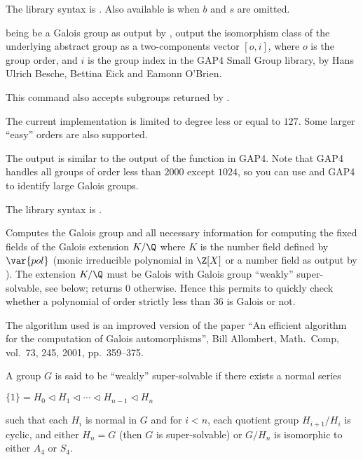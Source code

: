 The library syntax is .
Also available is  when $b$ and $s$
are omitted.

\label{se:galoisidentify}
 being be a Galois group as output by ,
output the isomorphism class of the underlying abstract group as a
two-components vector $[o,i]$, where $o$ is the group order, and $i$ is the
group index in the GAP4 Small Group library, by Hans Ulrich Besche, Bettina
Eick and Eamonn O'Brien.

This command also accepts subgroups returned by .

The current implementation is limited to degree less or equal to $127$.
Some larger ``easy'' orders are also supported.

The output is similar to the output of the function  in GAP4.
Note that GAP4  handles all groups of order less than $2000$
except $1024$, so you can use  and GAP4 to identify large
Galois groups.

The library syntax is .

\label{se:galoisinit}
Computes the Galois group
and all necessary information for computing the fixed fields of the
Galois extension $K/\Q$ where $K$ is the number field defined by
$\var{pol}$ (monic irreducible polynomial in $\Z[X]$ or
a number field as output by ). The extension $K/\Q$ must be
Galois with Galois group ``weakly'' super-solvable, see below;
returns 0 otherwise. Hence this permits to quickly check whether a polynomial
of order strictly less than $36$ is Galois or not.

The algorithm used is an improved version of the paper
``An efficient algorithm for the computation of Galois automorphisms'',
Bill Allombert, Math.~Comp, vol.~73, 245, 2001, pp.~359--375.

A group $G$ is said to be ``weakly'' super-solvable if there exists a
normal series

$\{1\} = H_0 \triangleleft H_1 \triangleleft \cdots \triangleleft H_{n-1}
\triangleleft H_n$

such that each $H_i$ is normal in $G$ and for $i<n$, each quotient group
$H_{i+1}/H_i$ is cyclic, and either $H_n=G$ (then $G$ is super-solvable) or
$G/H_n$ is isomorphic to either $A_4$ or $S_4$.

